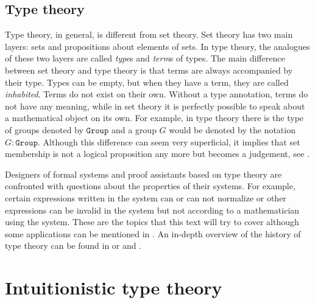 \documentclass[12pt,a4paper,twoside,xetex]{book} %
\newcommand{\keyword}[1]{\emph{#1}\index{#1}}
\newcommand{\op}[1]{\mathtt{#1}}
\begin{document}




\subsection{Type theory}

Type theory, in general, is different from set theory. Set theory has two main layers: sets and propositions about elements of sets. In type theory, the analogues of these two layers are called \keyword{type}s and \keyword{term}s of types. The main difference between set theory and type theory is that terms are always accompanied by their type. Types can be empty, but when they have a term, they are called \keyword{inhabited}. Terms do not exist on their own. Without a type annotation, terms do not have any meaning, while in set theory it is perfectly possible to speak about a mathematical object on its own. For example, in type theory there is the type of groups denoted by $\op{Group}$ and a group $G$ would be denoted by the notation $G : \op{Group}$. Although this difference can seem very superficial, it implies that set membership is not a logical proposition any more but becomes a judgement, see .

Designers of formal systems and proof assistants based on type theory are confronted with questions about the properties of their systems. For example, certain expressions written in the system can or can not normalize or other expressions can be invalid in the system but not according to a mathematician using the system. These are the topics that this text will try to cover although some applications can be mentioned in . An in-depth overview of the history of type theory can be found in \cite{Coquand2013oct} or \cite{Constable2011} and \cite{Constable2015July}.


\section{Intuitionistic type theory}
\end{document}
